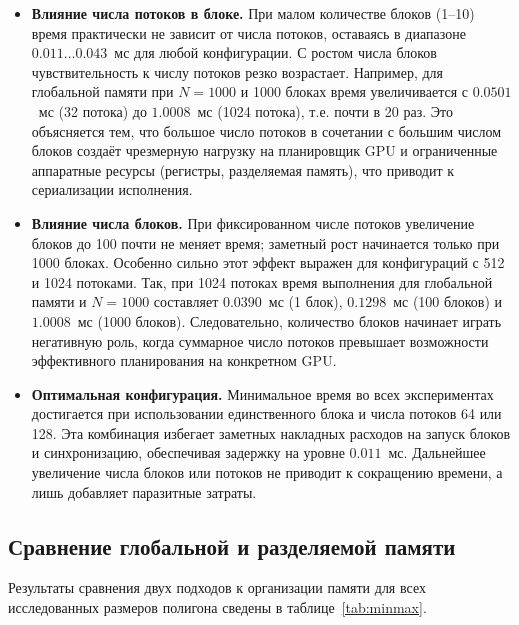 \documentclass{article}[14pt]
\begin{document}
\begin{itemize}
    \item \textbf{Влияние числа потоков в блоке.}  
    При малом количестве блоков (1--10) время практически не зависит от числа потоков, оставаясь в диапазоне $0.011\ldots0.043$~мс для любой конфигурации.  
    С ростом числа блоков чувствительность к числу потоков резко возрастает.  
    Например, для глобальной памяти при $N=1000$ и 1000 блоках время увеличивается с $0.0501$~мс (32 потока) до $1.0008$~мс (1024 потока), т.е. почти в 20 раз.  
    Это объясняется тем, что большое число потоков в сочетании с большим числом блоков создаёт чрезмерную нагрузку на планировщик GPU и ограниченные аппаратные ресурсы (регистры, разделяемая память), что приводит к сериализации исполнения.

    \item \textbf{Влияние числа блоков.}  
    При фиксированном числе потоков увеличение блоков до 100 почти не меняет время; заметный рост начинается только при 1000 блоках.  
    Особенно сильно этот эффект выражен для конфигураций с 512 и 1024 потоками.  
    Так, при 1024 потоках время выполнения для глобальной памяти и $N=1000$ составляет $0.0390$~мс (1 блок), $0.1298$~мс (100 блоков) и $1.0008$~мс (1000 блоков).  
    Следовательно, количество блоков начинает играть негативную роль, когда суммарное число потоков превышает возможности эффективного планирования на конкретном GPU.

    \item \textbf{Оптимальная конфигурация.}  
    Минимальное время во всех экспериментах достигается при использовании единственного блока и числа потоков 64 или 128.  
    Эта комбинация избегает заметных накладных расходов на запуск блоков и синхронизацию, обеспечивая задержку на уровне $0.011$~мс.  
    Дальнейшее увеличение числа блоков или потоков не приводит к сокращению времени, а лишь добавляет паразитные затраты.
\end{itemize}


\subsection*{Сравнение глобальной и разделяемой памяти}

Результаты сравнения двух подходов к организации памяти для всех исследованных размеров полигона сведены в таблице~\ref{tab:minmax}.
\end{document}
